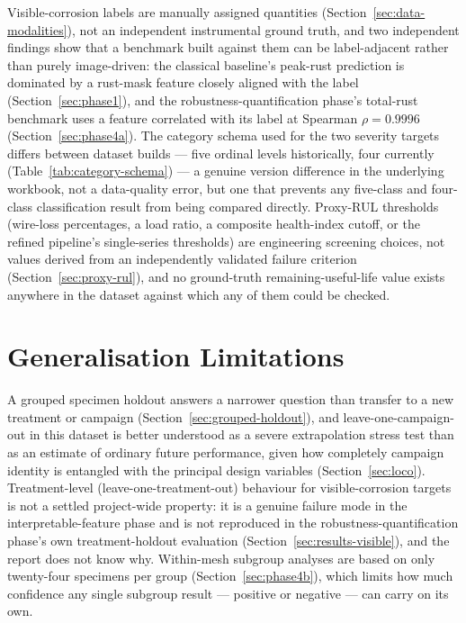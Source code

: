 Visible-corrosion labels are manually assigned quantities
(Section~\ref{sec:data-modalities}), not an independent instrumental
ground truth, and two independent findings show that a benchmark built
against them can be label-adjacent rather than purely image-driven: the
classical baseline's peak-rust prediction is dominated by a rust-mask
feature closely aligned with the label (Section~\ref{sec:phase1}), and the
robustness-quantification phase's total-rust benchmark uses a feature
correlated with its label at Spearman $\rho=0.9996$
(Section~\ref{sec:phase4a}). The category schema used for the two
severity targets differs between dataset builds — five ordinal levels
historically, four currently (Table~\ref{tab:category-schema}) — a
genuine version difference in the underlying workbook, not a data-quality
error, but one that prevents any five-class and four-class classification
result from being compared directly. Proxy-RUL thresholds (wire-loss
percentages, a load ratio, a composite health-index cutoff, or the refined
pipeline's single-series thresholds) are engineering screening choices,
not values derived from an independently validated failure criterion
(Section~\ref{sec:proxy-rul}), and no ground-truth remaining-useful-life
value exists anywhere in the dataset against which any of them could be
checked.

\section{Generalisation Limitations}
\label{sec:lim-generalisation}

A grouped specimen holdout answers a narrower question than transfer to a
new treatment or campaign (Section~\ref{sec:grouped-holdout}), and
leave-one-campaign-out in this dataset is better understood as a severe
extrapolation stress test than as an estimate of ordinary future
performance, given how completely campaign identity is entangled with the
principal design variables (Section~\ref{sec:loco}). Treatment-level
(leave-one-treatment-out) behaviour for visible-corrosion targets is not a
settled project-wide property: it is a genuine failure mode in the
interpretable-feature phase and is not reproduced in the
robustness-quantification phase's own treatment-holdout evaluation
(Section~\ref{sec:results-visible}), and the report does not know why.
Within-mesh subgroup analyses are based on only twenty-four specimens per
group (Section~\ref{sec:phase4b}), which limits how much confidence any
single subgroup result — positive or negative — can carry on its own.

